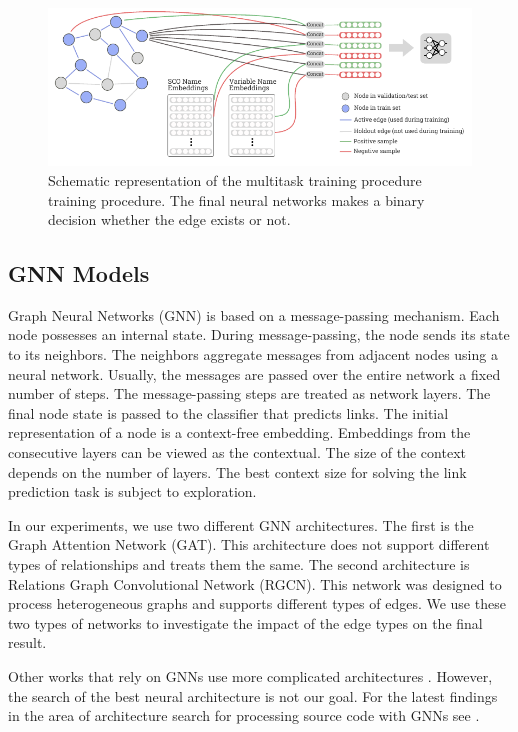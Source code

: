 \documentclass[a4paper,twoside]{article}
\begin{document}
\begin{figure}
    \centering
    \includegraphics[width=\textwidth]{model.pdf}
    \caption{Schematic representation of the multitask training procedure training procedure. The final neural networks makes a binary decision whether the edge exists or not.}
    \label{fig:model}
\end{figure}

\subsection{GNN Models}

Graph Neural Networks (GNN) is based on a message-passing mechanism. Each node possesses an internal state. During message-passing, the node sends its state to its neighbors. The neighbors aggregate messages from adjacent nodes using a neural network. Usually, the messages are passed over the entire network a fixed number of steps. The message-passing steps are treated as network layers. The final node state is passed to the classifier that predicts links. The initial representation of a node is a context-free embedding. Embeddings from the consecutive layers can be viewed as the contextual. The size of the context depends on the number of layers. The best context size for solving the link prediction task is subject to exploration.

In our experiments, we use two different GNN architectures. The first is the Graph Attention Network (GAT). This architecture does not support different types of relationships and treats them the same. The second architecture is Relations Graph Convolutional Network (RGCN). This network was designed to process heterogeneous graphs and supports different types of edges. We use these two types of networks to investigate the impact of the edge types on the final result. 

Other works that rely on GNNs use more complicated architectures \cite{Allamanis2017} \cite{Cvitkovic2018}. However, the search of the best neural architecture is not our goal. For the latest findings in the area of architecture search for processing source code with GNNs see \cite{hellendoorn2020global}.
\end{document}
